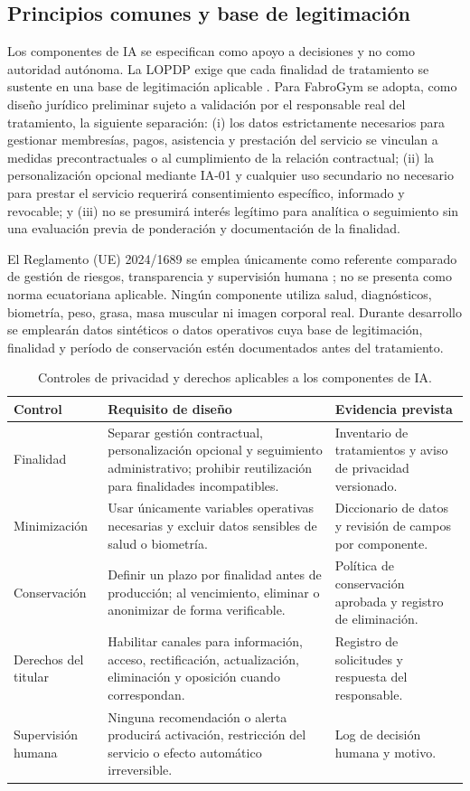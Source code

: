 
\subsection{Principios comunes y base de legitimación}
Los componentes de IA se especifican como apoyo a decisiones y no como autoridad autónoma. La LOPDP exige que cada finalidad de tratamiento se sustente en una base de legitimación aplicable \cite{lopdp,spdp}. Para FabroGym se adopta, como diseño jurídico preliminar sujeto a validación por el responsable real del tratamiento, la siguiente separación: (i) los datos estrictamente necesarios para gestionar membresías, pagos, asistencia y prestación del servicio se vinculan a medidas precontractuales o al cumplimiento de la relación contractual; (ii) la personalización opcional mediante IA-01 y cualquier uso secundario no necesario para prestar el servicio requerirá consentimiento específico, informado y revocable; y (iii) no se presumirá interés legítimo para analítica o seguimiento sin una evaluación previa de ponderación y documentación de la finalidad.

El Reglamento (UE) 2024/1689 se emplea únicamente como referente comparado de gestión de riesgos, transparencia y supervisión humana \cite{aiact}; no se presenta como norma ecuatoriana aplicable. Ningún componente utiliza salud, diagnósticos, biometría, peso, grasa, masa muscular ni imagen corporal real. Durante desarrollo se emplearán datos sintéticos o datos operativos cuya base de legitimación, finalidad y período de conservación estén documentados antes del tratamiento.

\begin{table}[H]
\centering
\caption{Controles de privacidad y derechos aplicables a los componentes de IA.}
\small
\begin{tabularx}{\textwidth}{|p{3.2cm}|Y|Y|}
\hline
\textbf{Control} & \textbf{Requisito de diseño} & \textbf{Evidencia prevista}\\\hline
Finalidad & Separar gestión contractual, personalización opcional y seguimiento administrativo; prohibir reutilización para finalidades incompatibles. & Inventario de tratamientos y aviso de privacidad versionado.\\\hline
Minimización & Usar únicamente variables operativas necesarias y excluir datos sensibles de salud o biometría. & Diccionario de datos y revisión de campos por componente.\\\hline
Conservación & Definir un plazo por finalidad antes de producción; al vencimiento, eliminar o anonimizar de forma verificable. & Política de conservación aprobada y registro de eliminación.\\\hline
Derechos del titular & Habilitar canales para información, acceso, rectificación, actualización, eliminación y oposición cuando correspondan. & Registro de solicitudes y respuesta del responsable.\\\hline
Supervisión humana & Ninguna recomendación o alerta producirá activación, restricción del servicio o efecto automático irreversible. & Log de decisión humana y motivo.\\\hline
\end{tabularx}
\end{table}

